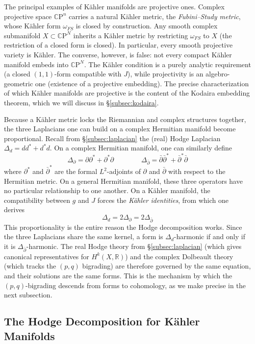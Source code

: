 \documentclass{article}
\newcommand{\R}{\mathbb{R}}
\newcommand{\CP}{\mathbb{C}\mathrm{P}}
\begin{document}
The principal examples of K\"{a}hler manifolds are projective ones. Complex
projective space $\CP^n$ carries a natural K\"{a}hler metric, the
\emph{Fubini--Study metric}, whose K\"{a}hler form $\omega_{FS}$ is closed by
construction. Any smooth complex submanifold $X \subset \CP^N$ inherits a
K\"{a}hler metric by restricting $\omega_{FS}$ to $X$ (the restriction of a
closed form is closed). In particular, every smooth projective variety is
K\"{a}hler. The converse, however, is false: not every compact K\"{a}hler
manifold embeds into $\CP^N$. The K\"{a}hler condition is a purely analytic
requirement (a closed $(1,1)$-form compatible with $J$), while projectivity is
an algebro-geometric one (existence of a projective embedding). The precise
characterization of which K\"{a}hler manifolds are projective is the content
of the Kodaira embedding theorem, which we will discuss in
\S\ref{subsec:kodaira}.

Because a K\"{a}hler metric locks the Riemannian and complex structures
together, the three Laplacians one can build on a complex Hermitian manifold
become proportional. Recall from \S\ref{subsec:laplacian} the (real) Hodge
Laplacian $\Delta_d = dd^* + d^*d$. On a complex Hermitian manifold, one can
similarly define
\[
  \Delta_\partial = \partial\partial^* + \partial^*\partial
  \qquad\qquad
  \Delta_{\bar\partial} = \bar\partial\bar\partial^* +
    \bar\partial^*\bar\partial
\]
where $\partial^*$ and $\bar\partial^*$ are the formal $L^2$-adjoints of
$\partial$ and $\bar\partial$ with respect to the Hermitian metric. On a
general Hermitian manifold, these three operators have no particular
relationship to one another. On a K\"{a}hler manifold, the compatibility
between $g$ and $J$ forces the \emph{K\"{a}hler identities}, from which one
derives
\[
  \Delta_d = 2\Delta_\partial = 2\Delta_{\bar\partial}
\]
This proportionality is the entire reason the Hodge decomposition works. Since
the three Laplacians share the same kernel, a form is $\Delta_d$-harmonic if
and only if it is $\Delta_{\bar\partial}$-harmonic. The real Hodge theory
from \S\ref{subsec:laplacian} (which gives canonical representatives for
$H^k(X, \R)$) and the complex Dolbeault theory (which tracks the $(p,q)$
bigrading) are therefore governed by the same equation, and their solutions
are the same forms. This is the mechanism by which the $(p,q)$-bigrading
descends from forms to cohomology, as we make precise in the next subsection.

\subsection{The Hodge Decomposition for K\"{a}hler Manifolds}%
\label{subsec:hodge_kahler}
\end{document}
